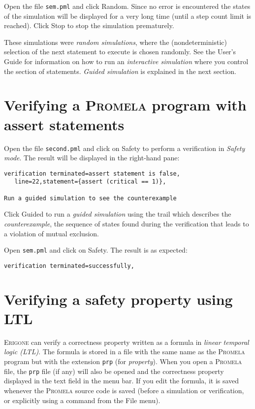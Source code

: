 \documentclass[11pt]{article}
\newcommand*{\prg}{\textsc{Erigone}}
\newcommand*{\prm}{\textsc{Promela}}
\newcommand*{\p}[1]{\texttt{#1}}
\newcommand*{\bu}[1]{\textsf{#1}}
\begin{document}
Open the file \p{sem.pml} and click \bu{Random}. Since no error is
encountered the states of the simulation will be displayed for a very
long time (until a step count limit is reached). Click \bu{Stop} to stop
the simulation prematurely.

These simulations were \emph{random simulations}, where the
(nondeterministic) selection of the next statement to execute is chosen
randomly. See the User's Guide for information on how to run an
\emph{interactive simulation} where you control the section of
statements. \emph{Guided simulation} is explained in the next section.

\section{Verifying a \prm{} program with assert statements}

Open the file \p{second.pml} and click on \bu{Safety} to perform a
verification in \emph{Safety mode}. The result will be displayed in the
right-hand pane:
\begin{verbatim}
verification terminated=assert statement is false,
   line=22,statement={assert (critical == 1)},

Run a guided simulation to see the counterexample
\end{verbatim}

Click \bu{Guided} to run a \emph{guided simulation} using the trail
which describes the \emph{counterexample}, the sequence of states found
during the verification that leads to a violation of mutual exclusion.

Open \p{sem.pml} and click on \bu{Safety}. The result is as expected:
\begin{verbatim}
verification terminated=successfully,
\end{verbatim}

\section{Verifying a safety property using LTL}

\prg{} can verify a correctness property written as a formula in
\emph{linear temporal logic (LTL)}. The formula is stored in a file with
the same name as the \prm{} program but with the extension \p{prp} (for
\emph{property}). When you open a \prm{} file, the \p{prp} file (if any)
will also be opened and the correctness property displayed in the text
field in the menu bar. If you edit the formula, it is saved whenever the
\prm{} source code is saved (before a simulation or verification, or
explicitly using a command from the \bu{File} menu).
\end{document}
